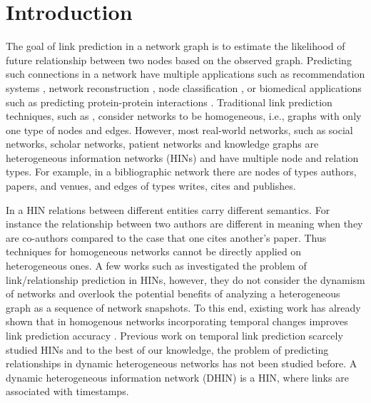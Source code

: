 \section{Introduction}
\label{Sec:Introduction}


The goal of link prediction in a network graph \cite{liben2007link} is to estimate the likelihood of future relationship between two nodes based on the observed graph. Predicting such connections in a network have multiple applications such as recommendation systems \cite{chen2005link,song2009scalable,lu2012recommender,li2013recommendation,guy2015social}, network reconstruction \cite{guimera2009missing}, node classification \cite{gallagher2008using}, or biomedical applications such as predicting protein-protein interactions \cite{lei2012novel}. Traditional link prediction techniques, such as \cite{liben2007link}, consider networks to be homogeneous, i.e., graphs with only one type of nodes and edges. However, most real-world networks, such as social networks, scholar networks, patient networks \cite{denny2012mining} and knowledge graphs \cite{wang2015incorporating} are heterogeneous information networks (HINs) \cite{shi2017survey} and have multiple node and relation types. For example, in a bibliographic network there are nodes of types authors, papers, and venues, and edges of types writes, cites and publishes.

In a HIN relations between different entities carry different semantics. For instance the relationship between two authors are different in meaning when they are co-authors compared to the case that one cites another's paper. Thus techniques for homogeneous networks cannot be directly applied on heterogeneous ones. A few works such as \cite{sun2011pathsim,sun2011ASONAM} investigated the problem of link/relationship prediction in HINs, however, they do not consider the dynamism of networks and overlook the potential benefits of analyzing a heterogeneous graph as a sequence of network snapshots. To this end, existing work has already shown that in homogenous networks incorporating temporal changes improves link prediction accuracy \cite{Zhu2016}. Previous work on temporal link prediction scarcely studied HINs and to the best of our knowledge, the problem of predicting relationships in dynamic heterogeneous networks has not been studied before. A dynamic heterogeneous information network (DHIN) is a HIN, where links are associated with timestamps.

